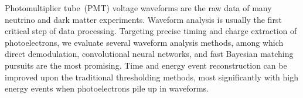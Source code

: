 Photomultiplier tube~(PMT) voltage waveforms are the raw data of many neutrino and dark matter experiments. Waveform analysis is usually the first critical step of data processing. Targeting precise timing and charge extraction of photoelectrons, we evaluate several waveform analysis methods, among which direct demodulation, convolutional neural networks, and fast Bayesian matching pursuits are the most promising. Time and energy event reconstruction can be improved upon the traditional thresholding methods, most significantly with high energy events when photoelectrons pile up in waveforms. 